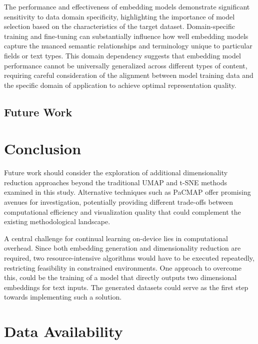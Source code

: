 The performance and effectiveness of embedding models demonstrate significant sensitivity to data domain specificity, highlighting the importance of model selection based on the characteristics of the target dataset. Domain-specific training and fine-tuning can substantially influence how well embedding models capture the nuanced semantic relationships and terminology unique to particular fields or text types. This domain dependency suggests that embedding model performance cannot be universally generalized across different types of content, requiring careful consideration of the alignment between model training data and the specific domain of application to achieve optimal representation quality.


\subsection{Future Work}
\label{sec:future-work}



\section{Conclusion}
\label{sec:conclusion}

Future work should consider the exploration of additional dimensionality reduction approaches beyond the traditional UMAP and t-SNE methods examined in this study. Alternative techniques such as PaCMAP \cite{JMLR:v22:20-1061} offer promising avenues for investigation, potentially providing different trade-offs between computational efficiency and visualization quality that could complement the existing methodological landscape.

A central challenge for continual learning on-device lies in computational overhead. Since both embedding generation and dimensionality reduction are required, two resource-intensive algorithms would have to be executed repeatedly, restricting feasibility in constrained environments. One approach to overcome this, could be the training of a model that directly outputs two dimensional embeddings for text inputs. The generated datasets could serve as the first step towards implementing such a solution.

\section{Data Availability}
\label{sec:data-av}

